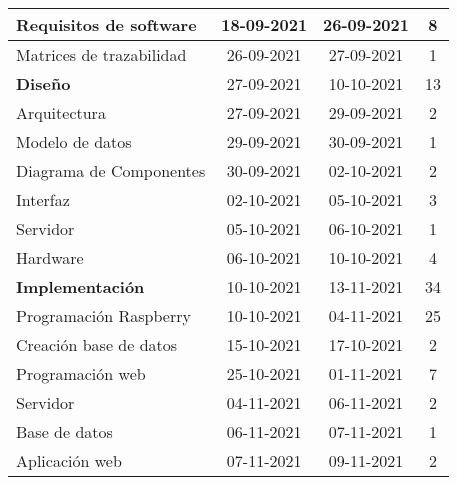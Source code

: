 \begin{longtable}[c]{lcc|c|}
	\multicolumn{1}{|l|}{Requisitos de software}             & \multicolumn{1}{c|}{18-09-2021} & 26-09-2021     & 8   \\ \hline
	\multicolumn{1}{|l|}{Matrices de trazabilidad}           & \multicolumn{1}{c|}{26-09-2021} & 27-09-2021     & 1   \\ \hline
	\multicolumn{1}{|l|}{\textbf{Diseño}}                    & \multicolumn{1}{c|}{27-09-2021} & 10-10-2021     & 13  \\ \hline
	\multicolumn{1}{|l|}{Arquitectura}                       & \multicolumn{1}{c|}{27-09-2021} & 29-09-2021     & 2   \\ \hline
	\multicolumn{1}{|l|}{Modelo de datos}                    & \multicolumn{1}{c|}{29-09-2021} & 30-09-2021     & 1   \\ \hline
	\multicolumn{1}{|l|}{Diagrama de Componentes}            & \multicolumn{1}{c|}{30-09-2021} & 02-10-2021     & 2   \\ \hline
	\multicolumn{1}{|l|}{Interfaz}                           & \multicolumn{1}{c|}{02-10-2021} & 05-10-2021     & 3   \\ \hline
	\multicolumn{1}{|l|}{Servidor}                           & \multicolumn{1}{c|}{05-10-2021} & 06-10-2021     & 1   \\ \hline
	\multicolumn{1}{|l|}{Hardware}                           & \multicolumn{1}{c|}{06-10-2021} & 10-10-2021     & 4   \\ \hline
	\multicolumn{1}{|l|}{\textbf{Implementación}}            & \multicolumn{1}{c|}{10-10-2021} & 13-11-2021     & 34  \\ \hline
	\multicolumn{1}{|l|}{Programación Raspberry}             & \multicolumn{1}{c|}{10-10-2021} & 04-11-2021     & 25  \\ \hline
	\multicolumn{1}{|l|}{Creación base de datos}             & \multicolumn{1}{c|}{15-10-2021} & 17-10-2021     & 2   \\ \hline
	\multicolumn{1}{|l|}{Programación web}                   & \multicolumn{1}{c|}{25-10-2021} & 01-11-2021     & 7   \\ \hline
	\multicolumn{1}{|l|}{Servidor}                           & \multicolumn{1}{c|}{04-11-2021} & 06-11-2021     & 2   \\ \hline
	\multicolumn{1}{|l|}{Base de datos}                      & \multicolumn{1}{c|}{06-11-2021} & 07-11-2021     & 1   \\ \hline
	\multicolumn{1}{|l|}{Aplicación web}                     & \multicolumn{1}{c|}{07-11-2021} & 09-11-2021     & 2   \\ \hline

\end{longtable}
